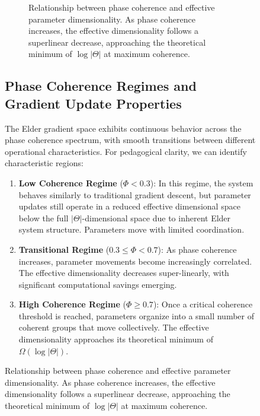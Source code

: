\begin{figure}[ht]
\begin{figure}[ht]
\caption{Relationship between phase coherence and effective parameter dimensionality. As phase coherence increases, the effective dimensionality follows a superlinear decrease, approaching the theoretical minimum of $\log|\Theta|$ at maximum coherence.}
\label{fig:dim_reduction}
\end{figure}

\subsection{Phase Coherence Regimes and Gradient Update Properties}

The Elder gradient space exhibits continuous behavior across the phase coherence spectrum, with smooth transitions between different operational characteristics. For pedagogical clarity, we can identify characteristic regions:

\begin{enumerate}
    \item \textbf{Low Coherence Regime} ($\Phi < 0.3$): In this regime, the system behaves similarly to traditional gradient descent, but parameter updates still operate in a reduced effective dimensional space below the full $|\Theta|$-dimensional space due to inherent Elder system structure. Parameters move with limited coordination.
    
    \item \textbf{Transitional Regime} ($0.3 \leq \Phi < 0.7$): As phase coherence increases, parameter movements become increasingly correlated. The effective dimensionality decreases super-linearly, with significant computational savings emerging.
    
    \item \textbf{High Coherence Regime} ($\Phi \geq 0.7$): Once a critical coherence threshold is reached, parameters organize into a small number of coherent groups that move collectively. The effective dimensionality approaches its theoretical minimum of $\Omega(\log|\Theta|)$.
\end{enumerate}


\end{figure}
